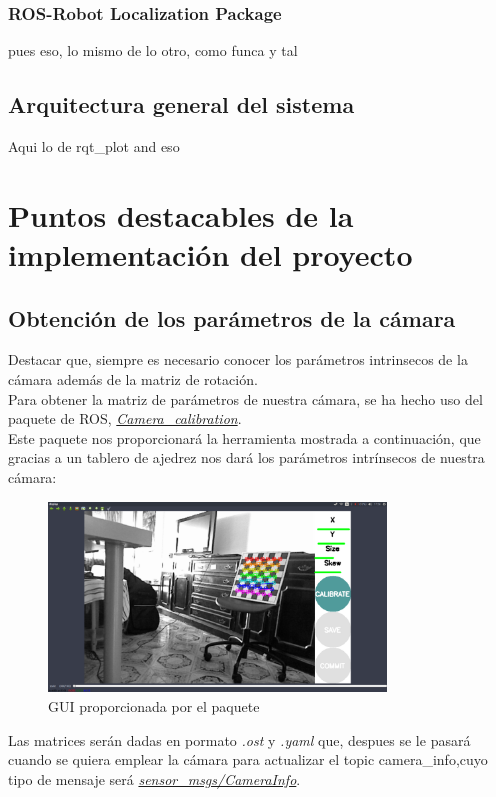 \subsubsection{ROS-Robot Localization Package}
pues eso, lo mismo de lo otro, como funca y tal
\subsection{Arquitectura general del sistema}
Aqui lo de rqt\_plot and eso

\section{Puntos destacables de la implementación del proyecto}
\subsection{Obtención de los parámetros de la cámara}
Destacar que, siempre es necesario conocer los parámetros intrinsecos de la cámara además de la matriz de rotación. \\
Para obtener la matriz de parámetros de nuestra cámara, se ha hecho uso del paquete de ROS, \textit{\href{http://wiki.ros.org/camera_calibration}{Camera\_calibration}}.\\
Este paquete nos proporcionará la herramienta mostrada a continuación, que gracias a un tablero de ajedrez nos dará los parámetros intrínsecos de nuestra cámara:
\begin{figure}[!ht]
    \centering
    \includegraphics[width=0.8\textwidth]{images/calibration_art}
    \caption{GUI proporcionada por el paquete}
\end{figure}

Las matrices serán dadas en pormato \textit{.ost} y \textit{.yaml} que, despues se le pasará cuando se quiera emplear la cámara para actualizar el topic camera\_info,cuyo 
tipo de mensaje será \textit{\href{http://docs.ros.org/melodic/api/sensor_msgs/html/msg/CameraInfo.html}{sensor\_msgs/CameraInfo}}.\\

